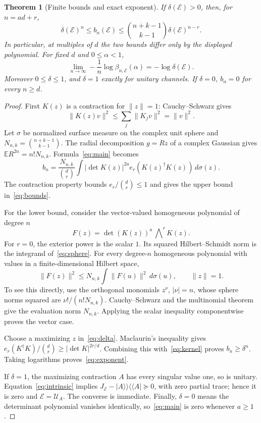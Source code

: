 \documentclass[11pt,a4paper]{article}
\newtheorem{theorem}{Theorem}[section]
\theoremstyle{remark}\newtheorem{remark}[theorem]{Remark}
\newcommand{\E}{\mathcal E}
\newcommand{\U}{\mathcal U}
\newcommand{\EE}{\mathbb E}
\newcommand{\vket}[1]{\lvert #1\rangle\!\rangle}
\newcommand{\vbra}[1]{\langle\!\langle #1\rvert}
\begin{document}
\begin{theorem}[Finite bounds and exact exponent]\label{thm:exponent}
If $\delta(\E)>0$, then, for $n=ad+r$,
\begin{equation}\boxed{\displaystyle
\delta(\E)^n\le b_n(\E)
\le\binom{n+k-1}{k-1}\delta(\E)^{n-r}.}\label{eq:bounds}
\end{equation}
In particular, at multiples of $d$ the two bounds differ only by the displayed polynomial. For fixed $d$ and $0\le\alpha<1$,
\begin{equation}
\lim_{n\to\infty}-\frac1n\log\beta_{n,\E}(\alpha)
=-\log\delta(\E).
\label{eq:exponent}
\end{equation}
Moreover $0\le\delta\le1$, and $\delta=1$ exactly for unitary channels. If $\delta=0$, $b_n=0$ for every $n\ge d$.
\end{theorem}

\begin{proof}
First $K(z)$ is a contraction for $\|z\|=1$: Cauchy--Schwarz gives
\[
\|K(z)v\|^2\le\sum_j\|K_jv\|^2=\|v\|^2.
\]
Let $\sigma$ be normalized surface measure on the complex unit sphere and $N_{n,k}=\binom{n+k-1}{k-1}$. The radial decomposition $g=Rz$ of a complex Gaussian gives $\EE R^{2n}=n!N_{n,k}$. Formula~\eqref{eq:main} becomes
\begin{equation}
b_n=\frac{N_{n,k}}{\binom dr}\int
|\det K(z)|^{2a}e_r(K(z)^\dagger K(z))\,d\sigma(z).
\label{eq:sphere}
\end{equation}
The contraction property bounds $e_r/\binom dr\le1$ and gives the upper bound in~\eqref{eq:bounds}.

For the lower bound, consider the vector-valued homogeneous polynomial of degree $n$
\[
F(z)=\det(K(z))^a\,\bigwedge\nolimits^r K(z).
\]
For $r=0$, the exterior power is the scalar $1$. Its squared Hilbert--Schmidt norm is the integrand of~\eqref{eq:sphere}. For every degree-$n$ homogeneous polynomial with values in a finite-dimensional Hilbert space,
\begin{equation}
\|F(z)\|^2\le N_{n,k}\int\|F(u)\|^2\,d\sigma(u),\qquad\|z\|=1.
\label{eq:kernel}
\end{equation}
To see this directly, use the orthogonal monomials $z^\nu$, $|\nu|=n$, whose sphere norms squared are $\nu!/(n!N_{n,k})$. Cauchy--Schwarz and the multinomial theorem give the evaluation norm $N_{n,k}$. Applying the scalar inequality componentwise proves the vector case.

Choose a maximizing $z$ in~\eqref{eq:delta}. Maclaurin's inequality gives $e_r(K^\dagger K)/\binom dr\ge|\det K|^{2r/d}$. Combining this with~\eqref{eq:kernel} proves $b_n\ge\delta^n$. Taking logarithms proves~\eqref{eq:exponent}.

If $\delta=1$, the maximizing contraction $A$ has every singular value one, so is unitary. Equation~\eqref{eq:intrinsic} implies $J_\E-\vket A\vbra A\succeq0$, with zero partial trace; hence it is zero and $\E=\U_A$. The converse is immediate. Finally, $\delta=0$ means the determinant polynomial vanishes identically, so~\eqref{eq:main} is zero whenever $a\ge1$.
\end{proof}
\end{document}
